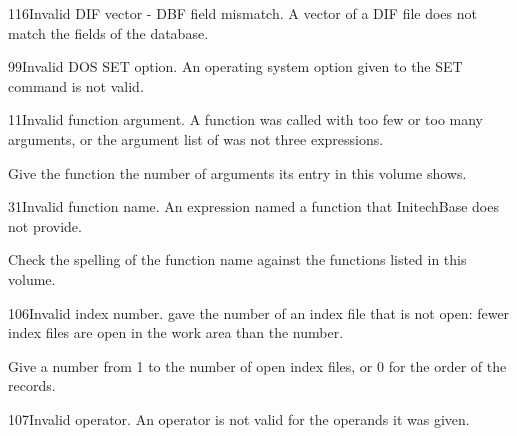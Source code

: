 \begin{XbaseMessageEntry}{116}{Invalid DIF vector - DBF field mismatch.}
A vector of a DIF file does not match the fields of the database.
\end{XbaseMessageEntry}

\begin{XbaseMessageEntry}{99}{Invalid DOS SET option.}
An operating system option given to the SET command is not valid.
\end{XbaseMessageEntry}

\begin{XbaseMessageEntry}{11}{Invalid function argument.}
A function was called with too few or too many arguments, or the argument list of  was not three expressions.

Give the function the number of arguments its entry in this volume shows.
\end{XbaseMessageEntry}

\begin{XbaseMessageEntry}{31}{Invalid function name.}
An expression named a function that InitechBase does not provide.

Check the spelling of the function name against the functions listed in this volume.
\end{XbaseMessageEntry}

\begin{XbaseMessageEntry}{106}{Invalid index number.}
 gave the number of an index file that is not open: fewer index files are open in the work area than the number.

Give a number from 1 to the number of open index files, or 0 for the order of the records.
\end{XbaseMessageEntry}

\begin{XbaseMessageEntry}{107}{Invalid operator.}
An operator is not valid for the operands it was given.
\end{XbaseMessageEntry}

